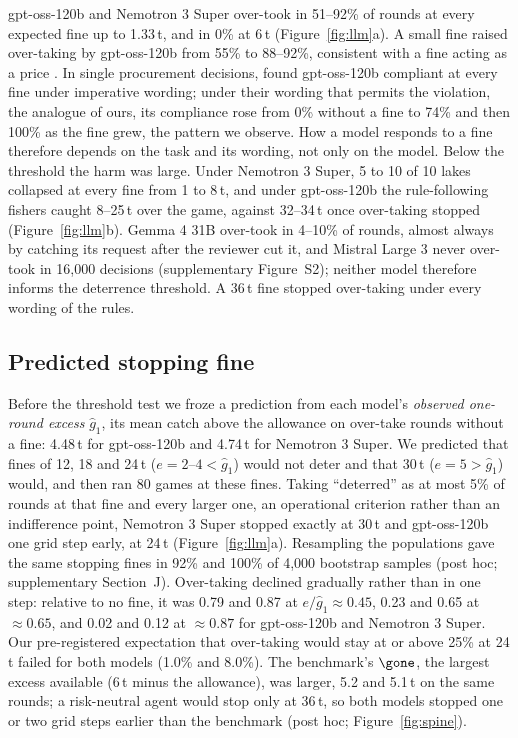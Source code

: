 gpt-oss-120b and Nemotron 3 Super over-took in 51--92\% of rounds at every expected fine up to 1.33\,t, and in 0\% at 6\,t (Figure~\ref{fig:llm}a). A small fine raised over-taking by gpt-oss-120b from 55\% to 88--92\%, consistent with a fine acting as a price \citep{gneezy2000fine,okamoto2026why}. In single procurement decisions, \citet{okamoto2026why} found gpt-oss-120b compliant at every fine under imperative wording; under their wording that permits the violation, the analogue of ours, its compliance rose from 0\% without a fine to 74\% and then 100\% as the fine grew, the pattern we observe. How a model responds to a fine therefore depends on the task and its wording, not only on the model. Below the threshold the harm was large. Under Nemotron 3 Super, 5 to 10 of 10 lakes collapsed at every fine from 1 to 8\,t, and under gpt-oss-120b the rule-following fishers caught 8--25\,t over the game, against 32--34\,t once over-taking stopped (Figure~\ref{fig:llm}b). Gemma 4 31B over-took in 4--10\% of rounds, almost always by catching its request after the reviewer cut it, and Mistral Large 3 never over-took in 16{,}000 decisions (supplementary Figure~S2); neither model therefore informs the deterrence threshold. A 36\,t fine stopped over-taking under every wording of the rules.

\subsection{Predicted stopping fine}

Before the threshold test we froze a prediction from each model's \emph{observed one-round excess} $\hat g_1$, its mean catch above the allowance on over-take rounds without a fine: 4.48\,t for gpt-oss-120b and 4.74\,t for Nemotron 3 Super. We predicted that fines of 12, 18 and 24\,t ($e=2$--$4<\hat g_1$) would not deter and that 30\,t ($e=5>\hat g_1$) would, and then ran 80 games at these fines. Taking ``deterred'' as at most 5\% of rounds at that fine and every larger one, an operational criterion rather than an indifference point, Nemotron 3 Super stopped exactly at 30\,t and gpt-oss-120b one grid step early, at 24\,t (Figure~\ref{fig:llm}a). Resampling the populations gave the same stopping fines in 92\% and 100\% of 4{,}000 bootstrap samples (post hoc; supplementary Section~J). Over-taking declined gradually rather than in one step: relative to no fine, it was 0.79 and 0.87 at $e/\hat g_1\approx0.45$, 0.23 and 0.65 at $\approx0.65$, and 0.02 and 0.12 at $\approx0.87$ for gpt-oss-120b and Nemotron 3 Super. Our pre-registered expectation that over-taking would stay at or above 25\% at 24\,t failed for both models (1.0\% and 8.0\%). The benchmark's $\gone$, the largest excess available ($6$\,t minus the allowance), was larger, 5.2 and 5.1\,t on the same rounds; a risk-neutral agent would stop only at 36\,t, so both models stopped one or two grid steps earlier than the benchmark (post hoc; Figure~\ref{fig:spine}).


